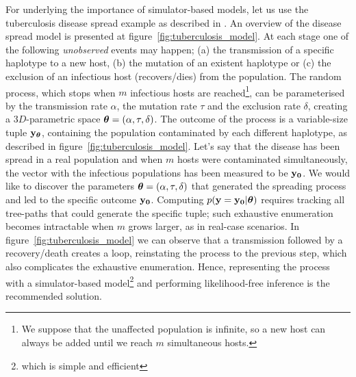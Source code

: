 For underlying the importance of simulator-based models, let us use
the tuberculosis disease spread example as described in
\autocite{Tanaka2006}. An overview of the disease spread model is
presented at figure~\ref{fig:tuberculosis_model}. At each stage one of
the following \textit{unobserved} events may happen; (a) the
transmission of a specific haplotype to a new host, (b) the mutation
of an existent haplotype or (c) the exclusion of an infectious host
(recovers/dies) from the population. The random process, which stops
when $m$ infectious hosts are reached\footnote{We suppose that the
  unaffected population is infinite, so a new host can always be added
  until we reach $m$ simultaneous hosts.}, can be parameterised by the
transmission rate $\alpha$, the mutation rate $\tau$ and the exclusion
rate $\delta$, creating a $3D$-parametric space
$\boldsymbol{\theta} = (\alpha, \tau, \delta)$. The outcome of the process is a
variable-size tuple $\mathbf{y}_{\boldsymbol{\theta}}$, containing the population
contaminated by each different haplotype, as described in
figure~\ref{fig:tuberculosis_model}. Let's say that the disease has
been spread in a real population and when $m$ hosts were contaminated
simultaneously, the vector with the infectious populations has been
measured to be $\mathbf{y_0}$. We would like to discover the parameters
$\boldsymbol{\theta} = (\alpha, \tau, \delta)$ that generated the spreading
process and led to the specific outcome $\mathbf{y_0}$. Computing
$p(\mathbf{y}=\mathbf{y_0}|\boldsymbol{\theta})$ requires tracking all tree-paths that could
generate the specific tuple; such exhaustive enumeration becomes
intractable when $m$ grows larger, as in real-case scenarios. In
figure~\ref{fig:tuberculosis_model} we can observe that a transmission
followed by a recovery/death creates a loop, reinstating the process
to the previous step, which also complicates the exhaustive
enumeration. Hence, representing the process with a simulator-based
model\footnote{which is simple and efficient} and performing
likelihood-free inference is the recommended solution.

